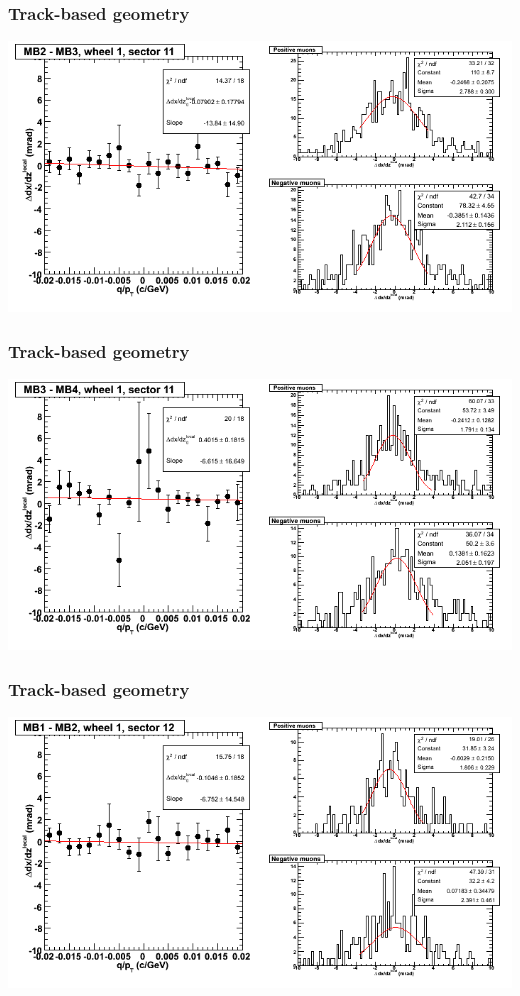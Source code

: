 \documentclass[compress]{beamer}
\begin{document}
\begin{frame}
\frametitle{Track-based geometry}
\includegraphics[width=\linewidth]{NOV4_segdiffs/dt13_slope_D_11_23.png}
\end{frame}

\begin{frame}
\frametitle{Track-based geometry}
\includegraphics[width=\linewidth]{NOV4_segdiffs/dt13_slope_D_11_34.png}
\end{frame}

\begin{frame}
\frametitle{Track-based geometry}
\includegraphics[width=\linewidth]{NOV4_segdiffs/dt13_slope_D_12_12.png}
\end{frame}
\end{document}
